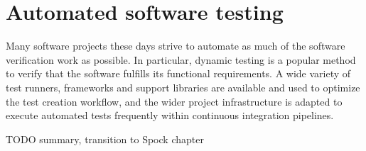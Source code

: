 \chapter{Automated software testing}
Many software projects these days
strive to automate as much of the
software verification work as possible.
In particular, dynamic testing
is a popular method to verify
that the software fulfills
its functional requirements.
A wide variety of test runners,
frameworks and support libraries are
available and used to optimize
the test creation workflow,
and the wider project infrastructure
is adapted to execute automated tests frequently
within continuous integration pipelines.











TODO summary, transition to Spock chapter
